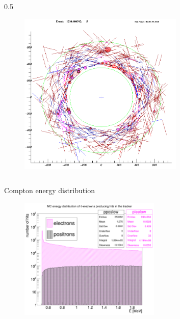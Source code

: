 \documentclass{beamer}
\begin{document}
\begin{frame}
\begin{columns}
\begin{column}{0.5\framewidth}
\begin{figure}[!h]
        \label{fig:bef}
\end{figure}
     \begin{figure}[!h]
        \centering
        \includegraphics[width =0.7\textwidth]{figures/png/Screenshot_20240811_124245.png}
        
        \label{fig:af}
    \end{figure}
\end{column}
\end{columns}
\end{frame}




\begin{frame}{Compton energy distribution}
    \begin{figure}[!h]
        \centering
                    \hspace*{-1.1em}
        \includegraphics[width =0.6\textwidth]{figures/png/Screenshot_20240820_154854.png}
       \label{fig:0pbarbefore}
\end{figure}
\end{frame}
\end{document}
